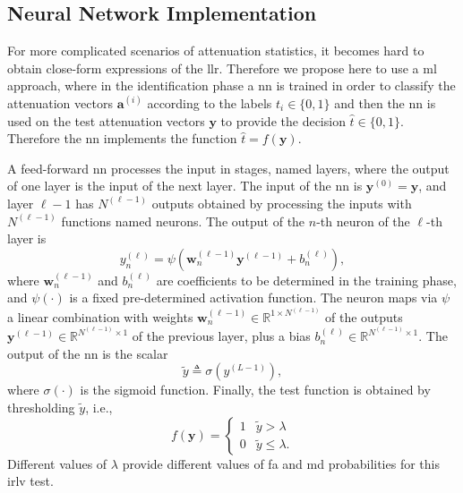 \documentclass[conference,draftcls,onecolumn]{IEEEtran}
\begin{document}
\subsection{Neural Network Implementation}\label{sec:nn}

For more complicated scenarios of attenuation statistics, it becomes hard to obtain close-form expressions of the \ac{llr}. Therefore we propose here to use a \ac{ml} approach, where in the identification phase a \ac{nn} is trained in order to classify the attenuation vectors $\bm{a}^{(i)}$ according to the labels $t_i \in \{0,1\}$ and then the \ac{nn} is used on the test attenuation vectors $\bm{y}$ to provide the decision $\hat{t} \in \{0,1\}$. Therefore the \ac{nn} implements the function $\hat{t} = f(\bm{y})$.

A feed-forward \ac{nn} processes the input in stages, named layers, where the output of one layer is the input of the next layer. The input of the \ac{nn} is $\bm{y}^{(0)} = \bm{y}$, and layer $\ell-1$ has $N^{(\ell-1)}$ outputs obtained by processing the inputs with $N^{(\ell-1)}$ functions named neurons. The output of the $n$-th neuron of the $\ell$-th layer is
\begin{equation}\label{eq:nonLin}
y_n^{(\ell)} = \psi\left( \bm{w}_n^{(\ell -1)}\bm{y}^{(\ell-1)}+b_n^{(\ell)} \right),
\end{equation}
where $\bm{w}_n^{(\ell -1)}$ and $b_n^{(\ell)}$ are coefficients to be determined in the training phase, and $\psi(\cdot)$ is a fixed pre-determined activation function. The neuron maps via  $\psi$ a  linear combination with weights $\bm{w}_n^{(\ell -1)}\in \mathbb{R}^{1\times N^{(\ell-1)}}$ of the outputs $\bm{y}^{(\ell-1)} \in \mathbb{R}^{N^{(\ell-1)} \times 1 }$ of the previous layer, plus a bias $b_n^{(\ell)} \in \mathbb{R}^{N^{(\ell-1)} \times 1 }$. The output of the \ac{nn} is the scalar 
\begin{equation}
	\tilde{y} \triangleq \sigma(y^{(L-1)}),	
\end{equation}
where $\sigma(\cdot)$ is the sigmoid function. Finally, the test function is obtained by thresholding $\tilde{y}$, i.e.,
\begin{equation}
\label{eq:decNN}
    f(\bm{y}) = \begin{cases}
    1 & \tilde{y} > \lambda \\
    0 & \tilde{y} \leq \lambda.
    \end{cases}
\end{equation}
Different values of $\lambda$ provide different values of \ac{fa} and \ac{md} probabilities for this \ac{irlv} test.
\end{document}
